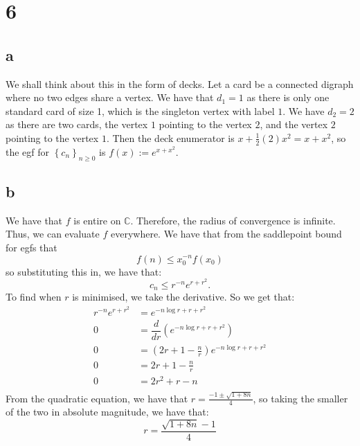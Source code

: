 \documentclass[]{article}
\begin{document}
\section{6}
\subsection{a}
We shall think about this in the form of decks. Let a card be a connected digraph where no two edges share a vertex. We have that $d_1 = 1$ as there is only one standard card of size 1, which is the singleton vertex with label $1$. We have $d_2 = 2$ as there are two cards, the vertex $1$ pointing to the vertex $2$, and the vertex $2$ pointing to the vertex $1$. Then the deck enumerator is $x + \frac{1}{2} (2) x^2 = x + x^2$, so the egf for $\left\{ c_n\right\}_{n \geq 0}$ is $f(x) := e^{x + x^2}$.

\subsection{b}
We have that $f$ is entire on $\mathbb{C}$. Therefore, the radius of convergence is infinite. Thus, we can evaluate $f$ everywhere. We have that from the saddlepoint bound for egfs that
\begin{equation}
	[x^n] f(n) \leq x_0^{-n} f(x_0)
\end{equation}
so substituting this in, we have that:
\begin{equation}
	c_n \leq r^{-n} e^{r + r^2}.
\end{equation}
To find when $r$ is minimised, we take the derivative. So we get that:
\begin{align*}
	 r^{-n} e^{r + r^2} &= e^{-n \log r + r + r^2}\\
	 0 &= \dfrac{d}{dr}(e^{-n \log r + r + r^2}) \\
	 0 &= \left(2r + 1 - \frac{n}{r}\right) e^{-n \log r + r + r^2}\\
	 0 &= 2r + 1 - \frac{n}{r}\\
	 0 &= 2r^2 + r - n\\
\end{align*}
From the quadratic equation, we have that $r = \frac{-1 \pm \sqrt{1 + 8n}}{4}$, so taking the smaller of the two in absolute magnitude, we have that:
\begin{equation}
	r = \frac{\sqrt{1 + 8n} - 1}{4}
\end{equation}
\end{document}
